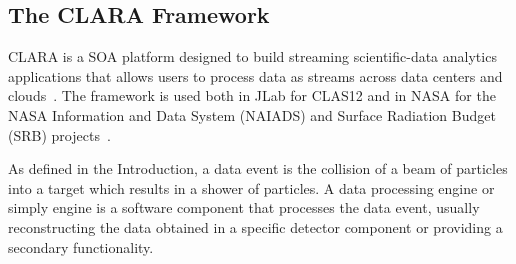 \subsection{The CLARA Framework} \label{ssec:framework_clara}
CLARA is a SOA platform designed to build streaming scientific-data analytics applications that allows users to process data as streams across data centers and clouds~\cite{gyurjyan2011clara}.
The framework is used both in JLab for CLAS12 and in NASA for the NASA Information and Data System (NAIADS) and Surface Radiation Budget (SRB) projects~\cite{lukashin2015earth}.

As defined in the Introduction, a data event is the collision of a beam of particles into a target which results in a shower of particles.
A data processing engine or simply engine is a software component that processes the data event, usually reconstructing the data obtained in a specific detector component or providing a secondary functionality.


